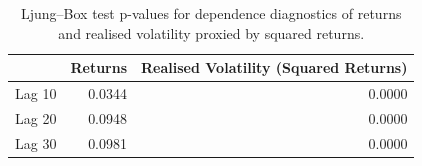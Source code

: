 \begin{table}
\caption{Ljung–Box test p-values for dependence diagnostics of returns and realised volatility proxied by squared returns.}
\label{tab:ljung_box_dependence}
\begin{tabular}{lrr}
\toprule
 & Returns & Realised Volatility (Squared Returns) \\
\midrule
Lag 10 & 0.0344 & 0.0000 \\
Lag 20 & 0.0948 & 0.0000 \\
Lag 30 & 0.0981 & 0.0000 \\
\bottomrule
\end{tabular}
\end{table}
